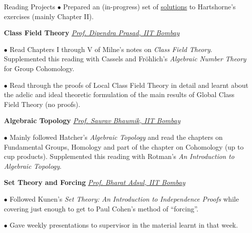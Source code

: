 \begin{rubric}{Reading Projects}
	$\bullet$ Prepared an (in-progress) set of \href{https://swayamchube.github.io/math/hartshorne-solutions/main.pdf}{solutions} to Hartshorne's exercises (mainly Chapter II).


	\entry*[2024\phantom{}] \textbf{Class Field Theory} \hfill \emph{\href{mailto:dprasad@iitb.ac.in}{Prof. Dipendra Prasad, IIT Bombay}}

	$\bullet$ Read Chapters I through V of Milne's notes on \emph{Class Field Theory}. Supplemented this reading with Cassels and Fr\"ohlich's \emph{Algebraic Number Theory} for Group Cohomology.

	$\bullet$ Read through the proofs of Local Class Field Theory in detail and learnt about the adelic and ideal theoretic formulation of the main results of Global Class Field Theory (no proofs).


	\entry*[2023\phantom{}] \textbf{Algebraic Topology} \hfill \emph{\href{mailto:saurav@math.iitb.ac.in}{Prof. Saurav Bhaumik, IIT Bombay}}

	$\bullet$ Mainly followed Hatcher's \emph{Algebraic Topology} and read the chapters on Fundamental Groups, Homology and part of the chapter on Cohomology (up to cup products). Supplemented this reading with Rotman's \emph{An Introduction to Algebraic Topology}.


	\entry*[2023\phantom{}] \textbf{Set Theory and Forcing} \hfill \emph{\href{mailto:adsul@cse.iitb.ac.in}{Prof. Bharat Adsul, IIT Bombay}}

	$\bullet$ Followed Kunen's \emph{Set Theory: An Introduction to Independence Proofs} while covering just enough to get to Paul Cohen's method of ``forcing''.

	$\bullet$ Gave weekly presentations to supervisor in the material learnt in that week.
\end{rubric}